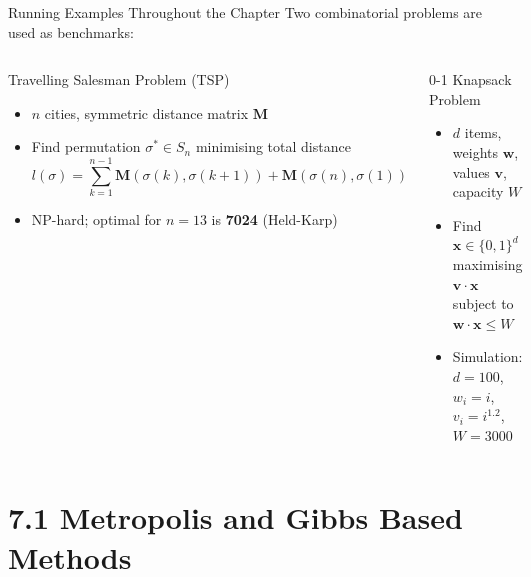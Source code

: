 \documentclass[aspectratio=169,10pt]{beamer}
\newcommand{\bx}{\mathbf{x}}
\newcommand{\bv}{\mathbf{v}}
\newcommand{\bw}{\mathbf{w}}
\begin{document}
\begin{frame}{Running Examples Throughout the Chapter}
  Two combinatorial problems are used as benchmarks:
  \medskip

  \begin{columns}[T]
    \begin{block}{Travelling Salesman Problem (TSP)}
      \begin{itemize}
        \item $n$ cities, symmetric distance matrix $\mathbf{M}$
        \item Find permutation $\sigma^* \in S_n$ minimising total distance
          \[l(\sigma) = \sum_{k=1}^{n-1}\mathbf{M}(\sigma(k),\sigma(k+1))
            + \mathbf{M}(\sigma(n),\sigma(1))\]
        \item NP-hard; optimal for $n=13$ is \textbf{7024} (Held-Karp)
      \end{itemize}
    \end{block}

    \begin{block}{0-1 Knapsack Problem}
      \begin{itemize}
        \item $d$ items, weights $\bw$, values $\bv$, capacity $W$
        \item Find $\bx \in \{0,1\}^d$ maximising $\bv \cdot \bx$
          subject to $\bw \cdot \bx \le W$
        \item Simulation: $d=100$, $w_i=i$, $v_i=i^{1.2}$, $W=3000$
      \end{itemize}
    \end{block}
  \end{columns}
\end{frame}

\section{7.1 Metropolis and Gibbs Based Methods}
\end{document}
